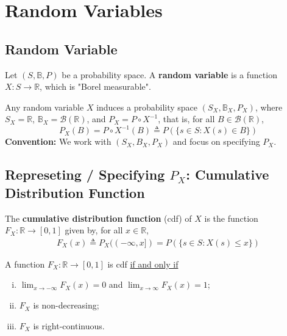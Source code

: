 \documentclass[11pt]{elegantbook}
\begin{document}
\section{Random Variables}

\subsection{Random Variable}
\begin{definition}
    \normalfont
    Let $(S,\mathbb{B},P)$ be a probability space. A \textbf{random variable} is a function $X: S \rightarrow \mathbb{R}$, which is "Borel measurable".
\end{definition}

\begin{definition}
    \normalfont
    Any random variable $X$ induces a probability space $(S_X,\mathbb{B}_X,P_X)$, where $S_X=\mathbb{R}$, $\mathbb{B}_X=\mathcal{B}(\mathbb{R})$, and $P_X=P\circ X^{-1}$, that is, for all $B\in \mathcal{B}(\mathbb{R})$, $$P_X(B)=P\circ X^{-1}(B)\triangleq P(\{s\in S: X(s)\in B\})$$
    \textbf{Convention:} We work with $(S_X,B_X,P_X)$ and focus on specifying $P_X$.
\end{definition}

\subsection{Represeting / Specifying $P_X$: Cumulative Distribution Function}
\begin{definition}
    \normalfont
    The \textbf{cumulative distribution function} (cdf) of $X$ is the function $F_X: \mathbb{R} \rightarrow [0,1]$ given by, for all $x\in \mathbb{R}$,
    \begin{equation}
        \begin{aligned}
            F_X(x)\triangleq P_X((-\infty,x])=P(\{s\in S: X(s)\leq x\})
        \end{aligned}
        \nonumber
    \end{equation}
\end{definition}

\begin{theorem}
    A function $F_X: \mathbb{R} \rightarrow [0,1]$ is cdf \underline{if and only if}
    \begin{enumerate}[(i).]
        \item $\lim_{x \rightarrow -\infty} F_X(x)=0$ and $\lim_{x \rightarrow \infty} F_X(x)=1$;
        \item $F_X$ is non-decreasing;
        \item $F_X$ is right-continuous.
    \end{enumerate}
\end{theorem}
\end{document}
